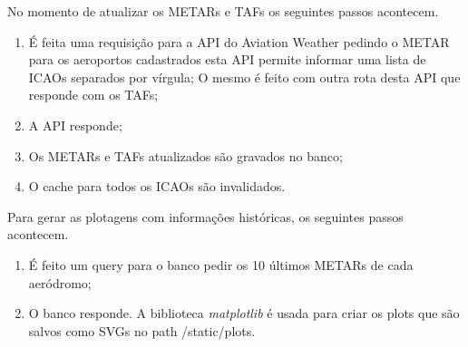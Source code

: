 No momento de atualizar os METARs e TAFs os seguintes passos acontecem.

\begin{enumerate}
\item É feita uma requisição para a API do Aviation Weather pedindo o METAR para os aeroportos
cadastrados esta API permite informar uma lista de ICAOs separados por vírgula;
O mesmo é feito com outra rota desta API que responde com os TAFs;
\item A API responde;
\item Os METARs e TAFs atualizados são gravados no banco;
\item O cache para todos os ICAOs são invalidados.
\end{enumerate}

Para gerar as plotagens com informações históricas, os seguintes passos acontecem.
\begin{enumerate}
    \item É feito um query para o banco pedir os 10 últimos METARs de cada aeródromo;
    \item O banco responde. A biblioteca \textit{matplotlib} é usada para criar os plots que são salvos como SVGs 
    no path /static/plots.
\end{enumerate}